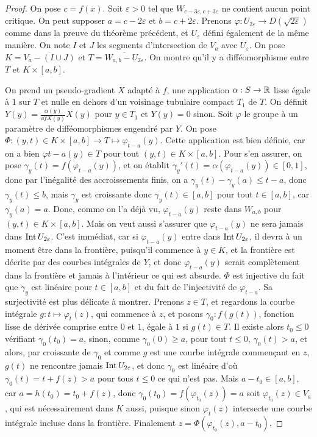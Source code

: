 \begin{proof}
    On pose $c=f(x)$. 
    Soit $\varepsilon > 0$ tel que $W_{c-3\varepsilon,c+3\varepsilon}$ ne contient aucun point 
    critique.
    On peut supposer $a=c-2\varepsilon$ et $b=c+2\varepsilon$. 
    Prenons $\varphi:U_{2\varepsilon}\to D(\sqrt{2\varepsilon})$ comme dans la preuve du théorème 
    précédent, et $U_\varepsilon$ défini également de la même manière.
    On note $I$ et $J$ les segments d'intersection de $V_a$ avec $U_\varepsilon$.
    On pose $K=\overline{V_a-(I\cup J)}$ et $T=\overline{W_{a,b}-U_{2\varepsilon}}$.
    On montre qu'il y a difféomorphisme entre $T$ et $K\times[a,b]$.

    On prend un pseudo-gradient $X$ adapté à $f$, une application $\alpha:S\to\operatorname{\mathbb R}$ lisse égale 
    à $1$ sur $T$ et nulle en dehors d'un voisinage tubulaire compact $T_1$ de $T$. 
    On définit $Y(y)=\frac{\alpha(y)}{\dd fX(y)}X(y)$ pour $y\in T_1$ et $Y(y)=0$ sinon.
    Soit $\varphi$ le groupe à un paramètre de difféomorphismes engendré par $Y$.
    On pose $\Phi:(y,t)\in K\times[a,b]\to T\mapsto\varphi_{t-a}(y)$. 
    Cette application est bien définie, car on a bien $\varphi{t-a}(y)\in T$ pour tout 
    $(y,t)\in K\times[a,b]$.
    Pour s'en assurer, on pose $\gamma_y(t)=f(\varphi_{t-a}(y))$, et on établit 
    $\gamma_y'(t)=\alpha(\varphi_{t-a}(y))\in[0,1]$,
    donc par l'inégalité des accroissements finis, on a $\gamma_y(t)-\gamma_y(a)\leq t-a$, 
    donc $\gamma_y(t)\leq b$, mais $\gamma_y$ est croissante donc $\gamma_y(t)\in[a,b]$ pour 
    tout $t\in[a,b]$, car $\gamma_y(a)=a$. 
    Donc, comme on l'a déjà vu, $\varphi_{t-a}(y)$ reste dans $W_{a,b}$ pour 
    $(y,t)\in K\times[a,b]$. 
    Mais on veut aussi s'assurer que $\varphi_{t-a}(y)$ ne sera jamais dans 
    $\operatorname{Int} U_{2\varepsilon}$. 
    C'est immédiat, car si $\varphi_{t-a}(y)$ entre dans 
    $\operatorname{Int} U_{2\varepsilon}$, il devra à un moment être dans la frontière, puisqu'il commence 
    à $y\in K$, et la frontière est décrite par des courbes intégrales de $Y$, et donc 
    $\varphi_{t-a}(y)$ serait complètement dans la frontière et jamais à l'intérieur ce qui 
    est absurde. $\Phi$ est injective du fait que $\gamma_y$ est linéaire pour $t\in[a,b]$ et 
    du fait de l'injectivité de $\varphi_{t-a}$. 
    Sa surjectivité est plus délicate à montrer. 
    Prenons $z\in T$, et regardons la courbe intégrale $g:t\mapsto\varphi_t(z)$, qui commence à 
    $z$, et posons $\gamma_0:f(g(t))$, fonction lisse de dérivée comprise entre $0$ et $1$, égale 
    à $1$ si $g(t)\in T$. 
    Il existe alors $t_0\leq 0$ vérifiant $\gamma_0(t_0)=a$, sinon, comme $\gamma_0(0)\geq a$, 
    pour tout $t\leq 0$, $\gamma_0(t)>a$, et alors,
    par croissante de $\gamma_0$ et comme $g$ est une courbe intégrale commençant en $z$, $g(t)$ 
    ne rencontre jamais $\operatorname{Int} U_{2\varepsilon}$, et donc $\gamma_0$ est linéaire d'où 
    $\gamma_0(t)=t+f(z)>a$ pour tous $t\leq 0$ ce qui n'est pas.
    Mais $a-t_0\in[a,b]$, car $a=h(t_0)=t_0+f(z)$, donc $\gamma_0(t_0)=f(\varphi_{t_0}(z))=a$ 
    soit $\varphi_{t_0}(z)\in V_a$, qui est nécessairement dans $K$ aussi, puisque sinon 
    $\varphi_t(z)$ intersecte une courbe intégrale incluse dans la frontière. 
    Finalement $z=\Phi(\varphi_{t_0}(z),a-t_0)$.



\end{proof}
